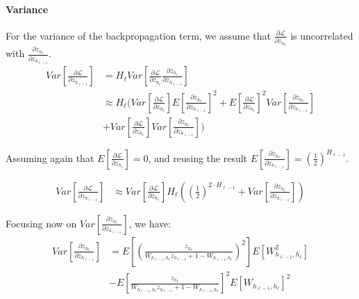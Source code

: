 \paragraph{Variance} For the variance of the backpropagation term, we assume that $\frac{\partial \mathcal{L}}{\partial z_{h_\ell}}$ is uncorrelated with $\frac{\partial z_{h_\ell}}{\partial z_{h_{\ell-1}}}$.
\begin{equation}
\begin{aligned}
Var\left[\frac{\partial \mathcal{L}}{\partial z_{h_{\ell-1}}}\right] &= H_\ell Var\left[\frac{\partial \mathcal{L}}{\partial z_{h_\ell}} \frac{\partial z_{h_\ell}}{\partial z_{h_{\ell-1}}}\right] \\
&\approx H_\ell \Bigg(Var\left[\frac{\partial \mathcal{L}}{\partial z_{h_\ell}}\right] E\left[\frac{\partial z_{h_\ell}}{\partial z_{h_{\ell-1}}}\right]^2 + E\left[\frac{\partial \mathcal{L}}{\partial z_{h_\ell}}\right]^2 Var\left[\frac{\partial z_{h_\ell}}{\partial z_{h_{\ell-1}}}\right] \\
&+ Var\left[\frac{\partial \mathcal{L}}{\partial z_{h_\ell}}\right] Var\left[\frac{\partial z_{h_\ell}}{\partial z_{h_{\ell-1}}}\right]\Bigg)
\end{aligned}
\end{equation}

Assuming again that $E\left[\frac{\partial \mathcal{L}}{\partial z_{h_\ell}}\right] = 0$, and reusing the result $E\left[\frac{\partial z_{h_\ell}}{\partial z_{h_{\ell-1}}}\right] = \left(\frac{1}{2}\right)^{H_{\ell-1}}$.

\begin{equation}
\begin{aligned}
Var\left[\frac{\partial \mathcal{L}}{\partial z_{h_{\ell-1}}}\right] &\approx Var\left[\frac{\partial \mathcal{L}}{\partial z_{h_\ell}}\right] H_\ell \left(\left(\frac{1}{2}\right)^{2 \cdot H_{\ell-1}} + Var\left[\frac{\partial z_{h_\ell}}{\partial z_{h_{\ell-1}}}\right]\right)
\end{aligned}
\end{equation}

Focusing now on $Var\left[\frac{\partial z_{h_\ell}}{\partial z_{h_{\ell-1}}}\right]$, we have:
\begin{equation}
\begin{aligned}
Var\left[\frac{\partial z_{h_\ell}}{\partial z_{h_{\ell-1}}}\right] &= E\left[\left(\frac{z_{h_\ell}}{W_{h_{\ell-1},h_\ell} z_{h_{\ell-1}} + 1 - W_{h_{\ell-1},h_\ell}}\right)^2\right] E[W_{h_{\ell-1},h_\ell}^2] \\
&- E\left[\frac{z_{h_\ell}}{W_{h_{\ell-1},h_\ell} z_{h_{\ell-1}} + 1 - W_{h_{\ell-1},h_\ell}}\right]^2 E[W_{h_{\ell-1},h_\ell}]^2
\end{aligned}
\end{equation}

